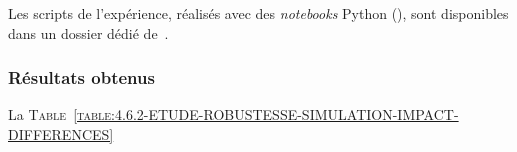 			
			\begin{leftBarInformation}
				Les scripts de l'expérience, réalisés avec des \textit{notebooks} Python (\cite{van-rossum-drake:2009:python-reference-manual}), sont disponibles dans un dossier dédié de~\cite{schild:2021:cognitivefactory-interactiveclusteringcomparativestudy}.
			\end{leftBarInformation}

		\subsubsection{Résultats obtenus}
		
			La \textsc{Table~\ref{table:4.6.2-ETUDE-ROBUSTESSE-SIMULATION-IMPACT-DIFFERENCES}}
			

